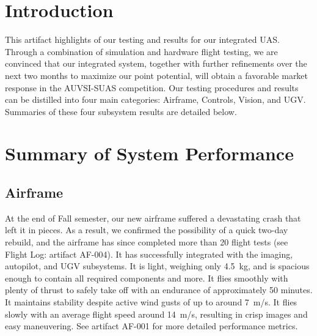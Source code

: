 \documentclass[]{auvsi_doc}
\begin{document}
\begin{AUVSITitlePage}
\begin{artifacttable}
\end{artifacttable}
\end{AUVSITitlePage}

\section{Introduction}

This artifact highlights of our testing and results for our integrated UAS. Through
a combination of simulation and hardware flight testing, we are convinced that our integrated system, together with further refinements over the next two months to maximize our point potential, will obtain a favorable market response in the AUVSI-SUAS competition. Our testing procedures and results can be distilled into four main categories: Airframe, Controls, Vision, and UGV. Summaries of these four subsystem results are detailed below.

\section{Summary of System Performance}



\subsection{Airframe}

At the end of Fall semester, our new airframe suffered a devastating crash that left it in pieces. As a result, we confirmed the possibility of a quick two-day rebuild, and the airframe has since completed more than 20 flight tests (see Flight Log: artifact AF-004). It has successfully integrated with the imaging, autopilot, and UGV subsystems. It is light, weighing only 4.5~kg, and is spacious enough to contain all required components and more. It flies smoothly with plenty of thrust to safely take off with an endurance of approximately 50 minutes. It maintains stability despite active wind gusts of up to around 7~m/s. It flies slowly with an average flight speed around 14~m/s, resulting in crisp images and easy maneuvering. See artifact AF-001 for more detailed performance metrics.
\end{document}
